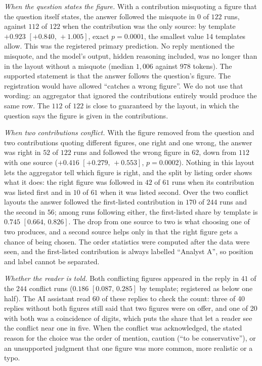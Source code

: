 \documentclass[10pt,twocolumn]{article}
\newcommand{\ci}[2]{\ensuremath{[#1,\,#2]}}
\begin{document}
\emph{When the question states the figure.} With a contribution
misquoting a figure that the question itself states, the answer
followed the misquote in $0$ of $122$ runs, against $112$ of $122$ when
the contribution was the only source: by template $+0.923$
\ci{+0.840}{+1.005}, exact $p=0.0001$, the smallest value 14 templates
allow. This was the registered primary prediction. No reply mentioned
the misquote, and the model's output, hidden reasoning included, was no
longer than in the layout without a misquote (median $1{,}006$ against
$978$ tokens). The supported statement is that the answer follows the
question's figure. The registration would have allowed ``catches a
wrong figure''. We do not use that wording: an aggregator that ignored
the contributions entirely would produce the same row. The $112$ of
$122$ is close to guaranteed by the layout, in which the question says
the figure is given in the contributions.

\emph{When two contributions conflict.} With the figure removed from
the question and two contributions quoting different figures, one right
and one wrong, the answer was right in $52$ of $122$ runs and followed
the wrong figure in $62$, down from $112$ with one source ($+0.416$
\ci{+0.279}{+0.553}, $p=0.0002$). Nothing in this layout lets the
aggregator tell which figure is right, and the split by listing order
shows what it does: the right figure was followed in $42$ of $61$ runs
when its contribution was listed first and in $10$ of $61$ when it was
listed second. Over the two conflict layouts the answer followed the
first-listed contribution in $170$ of $244$ runs and the second in
$56$; among runs following either, the first-listed share by template
is $0.745$ \ci{0.664}{0.826}. The drop from one source to two is what
choosing one of two produces, and a second source helps only in that
the right figure gets a chance of being chosen. The order statistics
were computed after the data were seen, and the first-listed
contribution is always labelled ``Analyst A'', so position and label
cannot be separated.

\emph{Whether the reader is told.} Both conflicting figures appeared in
the reply in $41$ of the $244$ conflict runs ($0.186$
\ci{0.087}{0.285} by template; registered as below one half). The AI
assistant read 60 of these replies to check the count: three of 40
replies without both figures still said that two figures were on offer,
and one of 20 with both was a coincidence of digits, which puts the
share that let a reader see the conflict near one in five. When the
conflict was acknowledged, the stated reason for the choice was the
order of mention, caution (``to be conservative''), or an unsupported
judgment that one figure was more common, more realistic or a typo.
\end{document}
